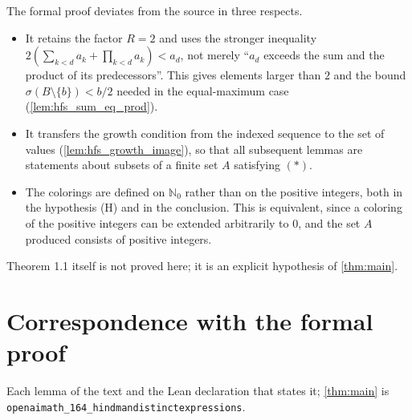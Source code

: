 \documentclass[11pt]{article}
\theoremstyle{definition}
\theoremstyle{remark}
\newcommand{\Nz}{\mathbb{N}_0}
\begin{document}
The formal proof deviates from the source in three respects.
\begin{itemize}
\item It retains the factor $R=2$ and uses the stronger inequality $2(\sum_{k<d}a_k+\prod_{k<d}a_k)<a_d$, not merely ``$a_d$ exceeds the sum and the product of its predecessors''. This gives elements larger than $2$ and the bound $\sigma(B\setminus\{b\})<b/2$ needed in the equal-maximum case (\cref{lem:hfs_sum_eq_prod}).
\item It transfers the growth condition from the indexed sequence to the set of values (\cref{lem:hfs_growth_image}), so that all subsequent lemmas are statements about subsets of a finite set $A$ satisfying $(\ast)$.
\item The colorings are defined on $\Nz$ rather than on the positive integers, both in the hypothesis (H) and in the conclusion. This is equivalent, since a coloring of the positive integers can be extended arbitrarily to $0$, and the set $A$ produced consists of positive integers.
\end{itemize}
Theorem 1.1 itself is not proved here; it is an explicit hypothesis of \cref{thm:main}.

\appendix
\section{Correspondence with the formal proof}
Each lemma of the text and the Lean declaration that states it; \cref{thm:main} is \texttt{openaimath\_164\_hindmandistinctexpressions}.
\end{document}
